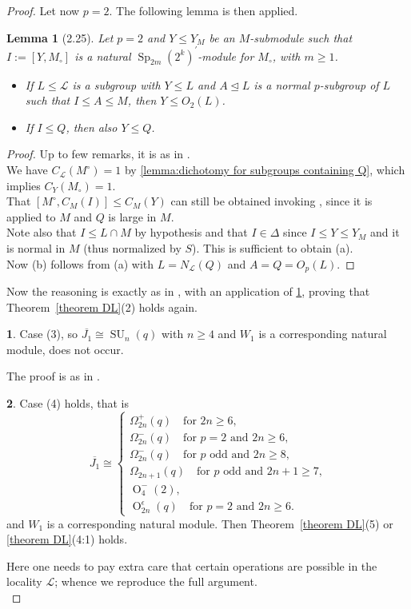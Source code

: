 \documentclass{amsart}
\numberwithin{equation}{section}
\newtheorem{lemma}[equation]{Lemma}
\theoremstyle{definition}
\theoremstyle{subresult}
\theoremstyle{caseresult}
\newtheorem{caseresult}{}[equation]
\renewcommand{\L}{\mathcal{L}}
\newcommand{\Sp}{\operatorname{Sp}}
\newcommand{\SU}{\operatorname{SU}}
\renewcommand{\O}{\operatorname{O}}
\newcommand{\ov}{\overline}
\newcommand{\norm}{\trianglelefteq}
\newcommand{\<}{\langle}
\renewcommand{\>}{\rangle}
\begin{document}
\begin{proof}
	Let now $p=2$. The following lemma is then applied.
	\begin{lemma}[2.25]
		\label{lemma2.25}
		Let $p=2$ and $Y \le Y_M$ be an $M$-submodule such that $I:=[Y,M_\circ]$ is a natural $\Sp_{2m}(2^k)^\prime$-module for $M_\circ$, with $m\ge 1$.
		\begin{itemize}
			\item[(a)] If $L \le \L$ is a subgroup with $Y \le L$ and $A \norm L$ is a normal $p$-subgroup of $L$ such that $I \le A \le M$, then $Y \le O_2(L)$.
			\item[(b)] If $I \le Q$, then also $Y \le Q$.
		\end{itemize} 
	\end{lemma}
	\begin{proof}
		Up to few remarks, it is as in \cite[Lemma 2.25]{Meier-Stell-Stroth:2012}.\\
		We have $C_\L(M^\circ)=1$ by \ref{lemma:dichotomy for subgroups containing Q}, which implies $C_Y(M_\circ)=1$.\\
		That $[M^\circ,C_M(I)] \le C_M(Y)$ can still be obtained invoking \cite[Lemma 1.52(c)]{Meier-Stell-Stroth:2012}, since it is applied to $M$ and $Q$ is large in $M$.\\
		Note also that $I \le L \cap M$ by hypothesis and that $I \in \Delta$ since $I \le Y \le Y_M$ and it is normal in $M$ (thus normalized by $S$). This is sufficient to obtain (a).\\
		Now (b) follows from (a) with $L=N_\L(Q)$ and $A=Q=O_p(L)$.
	\end{proof}
	Now the reasoning is exactly as in \cite[Lemma 4.14, Case 2]{Meier-Stell-Stroth:2012}, with an application of \ref{lemma2.25}, proving that Theorem~\ref{theorem DL}(2) holds again.
	
	\setcounter{caseresult}{2}
	\begin{caseresult}
		Case (3), so $\ov{J_1} \cong \SU_n(q)$ with $n \ge 4$ and $W_1$ is a corresponding natural module, does not occur.
	\end{caseresult}
	The proof is as in \cite[Lemma 4.14, Case 3]{Meier-Stell-Stroth:2012}.
	
	\begin{caseresult}
		Case (4) holds, that is
		\[
		\ov{J_1} \cong \begin{cases*}
			\Omega_{2n}^+(q) \quad \text{for $2n \ge 6$,} \\
			\Omega_{2n}^-(q) \quad \text{for $p=2$ and $2n \ge 6$,} \\
			\Omega_{2n}^-(q) \quad \text{for $p$ odd and $2n \ge 8$,} \\
			\Omega_{2n+1}(q) \quad \text{for $p$ odd and $2n+1 \ge 7$,} \\
			\O_4^-(2), \\
			\O_{2n}^\epsilon(q) \quad \text{for $p=2$ and $2n \ge6$.}
		\end{cases*}
		\] 
		and $W_1$ is a corresponding natural module. Then Theorem~\ref{theorem DL}(5) or \ref{theorem DL}(4:1) holds.
	\end{caseresult}
	Here one needs to pay extra care that certain operations are possible in the locality $\L$; whence we reproduce the full argument.\\
	

\end{proof}
\end{document}
